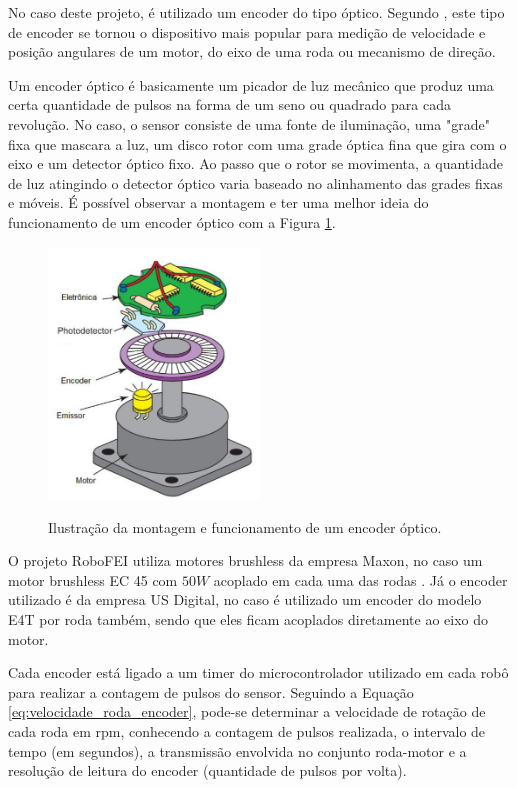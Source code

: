 \documentclass[acronym, symbols, table]{fei}
\begin{document}
				No caso deste projeto, é utilizado um encoder do tipo óptico. Segundo \textcite{siegwart2011introduction}, este tipo de encoder se tornou o dispositivo mais popular para medição de velocidade e posição angulares de um motor, do eixo de uma roda ou mecanismo de direção.
				
				Um encoder óptico é basicamente um picador de luz mecânico que produz uma certa quantidade de pulsos na forma de um seno ou quadrado para cada revolução. No caso, o sensor consiste de uma fonte de iluminação, uma "grade" fixa que mascara a luz, um disco rotor com uma grade óptica fina que gira com o eixo e um detector óptico fixo. Ao passo que o rotor se movimenta, a quantidade de luz atingindo o detector óptico varia baseado no alinhamento das grades fixas e móveis. É possível observar a montagem e ter uma melhor ideia do funcionamento de um encoder óptico com a Figura \ref{fig:optical_encoder}.
				
				\begin{figure}[!htb]
					\centering
					\caption{Ilustração da montagem e funcionamento de um encoder óptico.} 
					\includegraphics[width=0.5\textwidth]{encoder_optico.png}
					\label{fig:optical_encoder}
				\end{figure}
				
				O projeto RoboFEI utiliza motores brushless da empresa Maxon\textregistered, no caso um motor brushless EC 45 com $50W$ acoplado em cada uma das rodas \cite{ec45_maxon}. Já o encoder utilizado é da empresa US Digital\textregistered \cite{e4t_encoder}, no caso é utilizado um encoder do modelo E4T por roda também, sendo que eles ficam acoplados diretamente ao eixo do motor.
				
				Cada encoder está ligado a um timer do microcontrolador utilizado em cada robô para realizar a contagem de pulsos do sensor. Seguindo a Equação \ref{eq:velocidade_roda_encoder}, pode-se determinar a velocidade de rotação de cada roda em rpm, conhecendo a contagem de pulsos realizada, o intervalo de tempo (em segundos), a transmissão envolvida no conjunto roda-motor e a resolução de leitura do encoder (quantidade de pulsos por volta).
				
\end{document}
